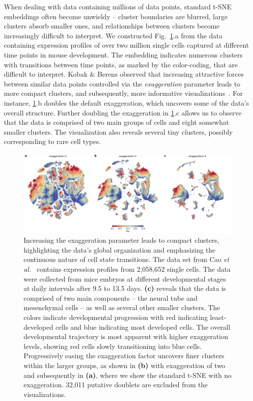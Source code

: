 \documentclass[twocolumn]{article}
\begin{document}
When dealing with data containing millions of data points, standard t-SNE
embeddings often become unwieldy -- cluster boundaries are blurred, large
clusters absorb smaller ones, and relationships between clusters become
increasingly difficult to interpret. We constructed Fig.~\ref{fig:cao}.a from
the data containing expression profiles of over two million single cells
captured at different time points in mouse development. The embedding indicates
numerous clusters with transitions between time points, as marked by the
color-coding, that are difficult to interpret. Kobak \& Berens observed that
increasing attractive forces between similar data points controlled via the
\textit{exaggeration} parameter leads to more compact clusters, and
subsequently, more informative visualizations~\cite{kobak2019art}. For instance,
\ref{fig:cao}.b doubles the default exaggeration, which uncovers some of the
data's overall structure. Further doubling the exaggeration in \ref{fig:cao}.c
allows us to observe that the data is comprised of two main groups of cells and
eight somewhat smaller clusters. The visualization also reveals several tiny
clusters, possibly corresponding to
rare cell types.

\begin{figure}[htbp]
  \includegraphics[width=\textwidth]{cao2019}
  \caption{\label{fig:cao}
  Increasing the exaggeration parameter leads to compact clusters, highlighting
	the data's global organization and emphasizing the continuous nature of
	cell state transitions. The data set from Cao \textit{et al.}~\cite{cao2019single}
	contains expression profiles from 2,058,652 single cells. The data were
	collected from mice embryos at different developmental stages at daily
	intervals after 9.5 to 13.5 days. \textbf{(c)} reveals that the data is
	comprised of two main components -- the neural tube and mesenchymal
	cells -- as well as several other smaller clusters. The
	colors indicate developmental progression with red indicating
	least-developed cells and blue indicating most developed cells. The
	overall developmental trajectory is most apparent with higher
	exaggeration levels, showing red cells slowly transitioning into blue
	cells. Progressively easing the exaggeration factor uncovers finer
	clusters within the larger groups, as shown in \textbf{(b)} with
	exaggeration of two and subsequently in \textbf{(a)}, where we show the
	standard t-SNE with no exaggeration. 32,011 putative doublets are
	excluded from the visualizations.
}
\end{figure}
\end{document}
